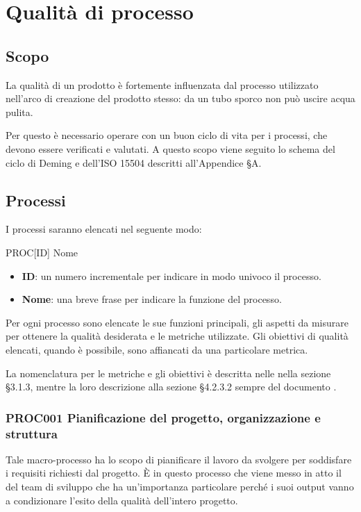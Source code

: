 \section{Qualità di processo}\label{QualitaProcesso}

\subsection{Scopo}
La qualità di un prodotto è fortemente influenzata dal processo utilizzato nell'arco di creazione del prodotto stesso: da un tubo sporco non può uscire acqua pulita.

Per questo è necessario operare con un buon ciclo di vita per i processi, che devono essere verificati e valutati. A questo scopo viene seguito lo schema del ciclo di Deming e dell'ISO 15504 descritti all'Appendice §A.

\subsection{Processi}
I processi saranno elencati nel seguente modo:

\begin{center}
	PROC[ID] Nome
\end{center}

\begin{itemize}
	\item \textbf{ID}: un numero incrementale per indicare in modo univoco il processo.
	\item \textbf{Nome}: una breve frase per indicare la funzione del processo.
\end{itemize}

Per ogni processo sono elencate le sue funzioni principali, gli aspetti da misurare per ottenere la qualità desiderata e le metriche utilizzate. Gli obiettivi di qualità elencati, quando è possibile, sono affiancati da una particolare metrica. 

La nomenclatura per le metriche e gli obiettivi è descritta nelle \Doc{\NdPv} nella sezione §3.1.3, mentre la loro descrizione alla sezione §4.2.3.2 sempre del documento \Doc{\NdPv}.

	\subsubsection{PROC001 Pianificazione del progetto, organizzazione e struttura}
	Tale macro-processo ha lo scopo di pianificare il lavoro da svolgere per soddisfare i requisiti richiesti dal progetto. È in questo processo che viene messo in atto il  del team di sviluppo che ha un'importanza particolare perché i suoi output vanno a condizionare l'esito della qualità dell'intero progetto.
	

